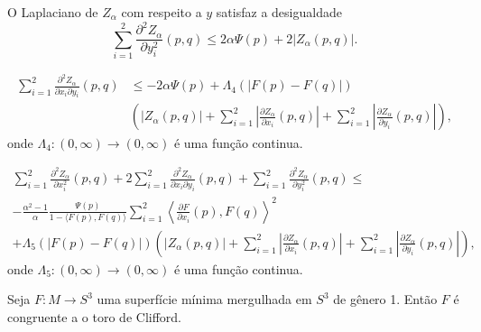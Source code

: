 \begin{lema}
	O Laplaciano de $Z_{\alpha}$ com respeito a $y$ satisfaz a desigualdade
	\begin{equation*}
		\sum_{i=1}^{2} \frac{\partial^2 Z_{\alpha}}{\partial y_i^2} (p,q) \leq 2 \alpha \Psi(p) + 2 |Z_{\alpha}(p,q)|.
	\end{equation*}
\end{lema}

\begin{lema}
	\begin{equation*}
		\begin{split}
		\sum_{i=1}^{2} \frac{\partial^2 Z_{\alpha}}{\partial x_i \partial y_i} (p,q) &\leq -2 \alpha \Psi(p) + \Lambda_4 (|F(p) - F(q)|)\\
		& \left( |Z_{\alpha}(p,q)| + \sum_{i=1}^{2} \left| \frac{\partial Z_{\alpha}}{\partial x_i} (p,q) \right| + \sum_{i=1}^{2} \left| \frac{\partial Z_{\alpha}}{\partial y_i} (p,q) \right| \right),
		\end{split}		
	\end{equation*}
	onde $\Lambda_4: (0,\infty) \rightarrow (0,\infty)$ é uma função continua.
\end{lema}

\begin{proposicao}
	\begin{multline*}
		\sum_{i=1}^{2} \frac{\partial^2 Z_{\alpha}}{\partial x_i^2} (p,q) + 2 \sum_{i=1}^{2} \frac{\partial^2 Z_{\alpha}}{\partial x_i \partial y_i} (p,q) + \sum_{i=1}^{2} \frac{\partial^2 Z_{\alpha}}{\partial y_i^2} (p,q) \leq \\
		- \frac{\alpha^2 - 1}{\alpha} \frac{\Psi(p)}{1 - \langle F(p), F(q) \rangle} \sum_{i=1}^{2} \left\langle \frac{\partial F}{\partial x_i} (p), F(q) \right\rangle^2 \\
		+ \Lambda_5(|F(p) - F(q)|) \left( |Z_{\alpha}(p,q)| + \sum_{i=1}^{2} \left| \frac{\partial Z_{\alpha}}{\partial x_i} (p,q) \right| + \sum_{i=1}^{2} \left| \frac{\partial Z_{\alpha}}{\partial y_i} (p,q) \right| \right),
	\end{multline*}
	onde $\Lambda_5: (0,\infty) \rightarrow (0,\infty)$ é uma função continua.
\end{proposicao}

\begin{teorema}[Brendle]
	Seja $F: M \rightarrow S^3$ uma superfície mínima mergulhada em $S^3$ de gênero 1. Então $F$ é congruente a o toro de Clifford.
\end{teorema}